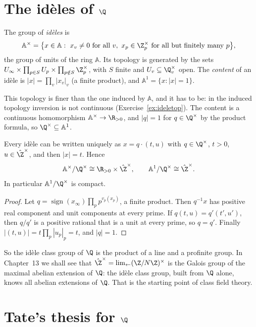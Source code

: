 \section{The id\`eles of \texorpdfstring{$\Q$}{Q}}

\begin{definition}
The group of \emph{id\`eles} is
\[
\mathbb{A}^\times=\bigl\{x\in\mathbb{A}:\ x_v\ne0\text{ for all }v,\ x_p\in\Z_p^\times\text{ for all but finitely many }p\bigr\},
\]
the group of units of the ring $\mathbb{A}$. Its topology is generated by the sets $U_\infty\times\prod_{p\in S}U_p\times\prod_{p\notin S}\Z_p^\times$, with
$S$ finite and $U_v\subseteq\Q_v^\times$ open. The \emph{content} of an id\`ele is $|x|=\prod_v|x_v|_v$ (a finite product), and
$\mathbb{A}^1=\{x:|x|=1\}$.
\end{definition}

This topology is finer than the one induced by $\mathbb{A}$, and it has to be: in the induced topology inversion is not continuous
(Exercise~\ref{ex:ideletop}). The content is a continuous homomorphism $\mathbb{A}^\times\to\R_{>0}$, and $|q|=1$ for $q\in\Q^\times$ by the product
formula, so $\Q^\times\subseteq\mathbb{A}^1$.

\begin{proposition}\label{prop:ideleQ}
Every id\`ele can be written uniquely as $x=q\cdot(t,u)$ with $q\in\Q^\times$, $t>0$, $u\in\hat{\Z}^\times$, and then $|x|=t$. Hence
\[
\mathbb{A}^\times/\Q^\times\cong\R_{>0}\times\hat{\Z}^\times,\qquad \mathbb{A}^1/\Q^\times\cong\hat{\Z}^\times.
\]
In particular $\mathbb{A}^1/\Q^\times$ is compact.
\end{proposition}
\begin{proof}
Let $q=\operatorname{sign}(x_\infty)\prod_pp^{v_p(x_p)}$, a finite product. Then $q^{-1}x$ has positive real component and unit components
at every prime. If $q(t,u)=q'(t',u')$, then $q/q'$ is a positive rational that is a unit at every prime, so $q=q'$. Finally
$|(t,u)|=t\prod_p|u_p|_p=t$, and $|q|=1$.
\end{proof}

So the id\`ele class group of $\Q$ is the product of a line and a profinite group. In Chapter~13 we shall see that
$\hat{\Z}^\times=\lim_{\leftarrow}(\Z/N\Z)^\times$ is the Galois group of the maximal abelian extension of $\Q$: the id\`ele class group, built from
$\Q$ alone, knows all abelian extensions of $\Q$. That is the starting point of class field theory.

\section{Tate's thesis for \texorpdfstring{$\Q$}{Q}}

